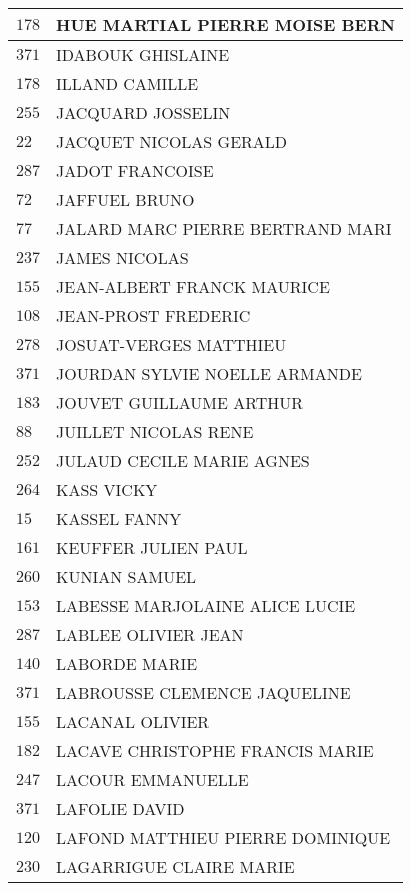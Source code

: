 \begin{xltabular}{\linewidth}{|l|X|}
    \hline
    $178$ & HUE MARTIAL PIERRE MOISE BERN \\
    \hline
    $371$ & IDABOUK GHISLAINE \\
    \hline
    $178$ & ILLAND CAMILLE \\
    \hline
    $255$ & JACQUARD JOSSELIN \\
    \hline
    $22$ & JACQUET NICOLAS GERALD \\
    \hline
    $287$ & JADOT FRANCOISE \\
    \hline
    $72$ & JAFFUEL BRUNO \\
    \hline
    $77$ & JALARD MARC PIERRE BERTRAND MARI \\
    \hline
    $237$ & JAMES NICOLAS \\
    \hline
    $155$ & JEAN-ALBERT FRANCK MAURICE \\
    \hline
    $108$ & JEAN-PROST FREDERIC \\
    \hline
    $278$ & JOSUAT-VERGES MATTHIEU \\
    \hline
    $371$ & JOURDAN SYLVIE NOELLE ARMANDE \\
    \hline
    $183$ & JOUVET GUILLAUME ARTHUR \\
    \hline
    $88$ & JUILLET NICOLAS RENE \\
    \hline
    $252$ & JULAUD CECILE MARIE AGNES \\
    \hline
    $264$ & KASS VICKY \\
    \hline
    $15$ & KASSEL FANNY \\
    \hline
    $161$ & KEUFFER JULIEN PAUL \\
    \hline
    $260$ & KUNIAN SAMUEL \\
    \hline
    $153$ & LABESSE MARJOLAINE ALICE LUCIE \\
    \hline
    $287$ & LABLEE OLIVIER JEAN \\
    \hline
    $140$ & LABORDE MARIE \\
    \hline
    $371$ & LABROUSSE CLEMENCE JAQUELINE \\
    \hline
    $155$ & LACANAL OLIVIER \\
    \hline
    $182$ & LACAVE CHRISTOPHE FRANCIS MARIE \\
    \hline
    $247$ & LACOUR EMMANUELLE \\
    \hline
    $371$ & LAFOLIE DAVID \\
    \hline
    $120$ & LAFOND MATTHIEU PIERRE DOMINIQUE \\
    \hline
    $230$ & LAGARRIGUE CLAIRE MARIE \\

\end{xltabular}
